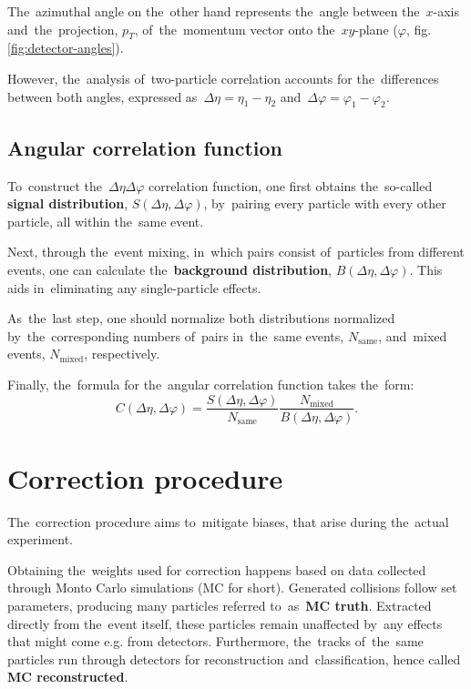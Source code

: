 \documentclass[11pt,a4paper,twoside]{book}
\numberwithin{equation}{chapter}
\begin{document}
The azimuthal angle on the other hand represents the angle between the $x$-axis and the projection, $p_T$, of the momentum vector onto the $xy$-plane ($\varphi$, fig. \ref{fig:detector-angles}).

However, the analysis of two-particle correlation accounts for the differences between both angles, expressed as $\Delta\eta = \eta_1 - \eta_2$ and $\Delta\varphi = \varphi_1 - \varphi_2$.

\subsection{Angular correlation function}

To construct the $\Delta\eta\Delta\varphi$ correlation function, one first obtains the so-called \textbf{signal distribution}, $S(\Delta\eta, \Delta\varphi)$, by pairing every particle with every other particle, all within the same event.

Next, through the event mixing, in which pairs consist of particles from different events, one can calculate the \textbf{background distribution}, $B(\Delta\eta, \Delta\varphi)$. This aids in eliminating any single-particle effects.


As the last step, one should normalize both distributions normalized by the corresponding numbers of pairs in the same events, $N_{\text{same}}$, and mixed events, $N_{\text{mixed}}$, respectively.

Finally, the formula for the angular correlation function takes the form:
\begin{equation}
    C(\Delta\eta, \Delta\varphi) = \frac{S(\Delta\eta, \Delta\varphi)}{N_{\text{same}}} \frac{N_{\text{mixed}}}{B(\Delta\eta, \Delta\varphi)}.
\end{equation}

\section{Correction procedure}

The correction procedure aims to mitigate biases, that arise during the actual experiment.

Obtaining the weights used for correction happens based on data collected through Monto Carlo simulations (MC for short). Generated collisions follow set parameters, producing many particles referred to as \textbf{MC truth}. Extracted directly from the event itself, these particles remain unaffected by any effects that might come e.g. from detectors. Furthermore, the tracks of the same particles run through detectors for reconstruction and classification, hence called \textbf{MC reconstructed}.
\end{document}
